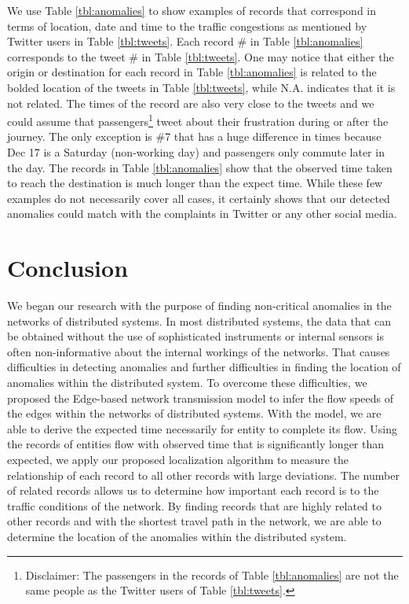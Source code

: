 \documentclass[conference]{IEEEtran.1.8}
\begin{document}
We use Table \ref{tbl:anomalies} to show examples of records that correspond in terms of location, date and time to the traffic congestions as mentioned by Twitter users in Table \ref{tbl:tweets}. Each record \# in Table \ref{tbl:anomalies} corresponds to the tweet \# in Table \ref{tbl:tweets}. One may notice that either the origin or destination for each record in Table \ref{tbl:anomalies} is related to the bolded location of the tweets in Table \ref{tbl:tweets}, while N.A. indicates that it is not related. The times of the record are also very close to the tweets and we could assume that passengers\footnote{Disclaimer: The passengers in the records of Table \ref{tbl:anomalies} are not the same people as the Twitter users of Table \ref{tbl:tweets}.} tweet about their frustration during or after the journey. The only exception is \#7 that has a huge difference in times because Dec 17 is a Saturday (non-working day) and passengers only commute later in the day. The records in Table \ref{tbl:anomalies} show that the observed time taken to reach the destination is much longer than the expect time. While these few examples do not necessarily cover all cases, it certainly shows that our detected anomalies could match with the complaints in Twitter or any other social media.

\section{Conclusion}

We began our research with the purpose of finding non-critical anomalies in the networks of distributed systems. In most distributed systems, the data that can be obtained without the use of sophisticated instruments or internal sensors is often non-informative about the internal workings of the networks. That causes difficulties in detecting anomalies and further difficulties in finding the location of anomalies within the distributed system. To overcome these difficulties, we proposed the Edge-based network transmission model to infer the flow speeds of the edges within the networks of distributed systems. With the model, we are able to derive the expected time necessarily for entity to complete its flow. Using the records of entities flow with observed time that is significantly longer than expected, we apply our proposed localization algorithm to measure the relationship of each record to all other records with large deviations. The number of related records allows us to determine how important each record is to the traffic conditions of the network. By finding records that are highly related to other records and with the shortest travel path in the network, we are able to determine the location of the anomalies within the distributed system.
\end{document}
